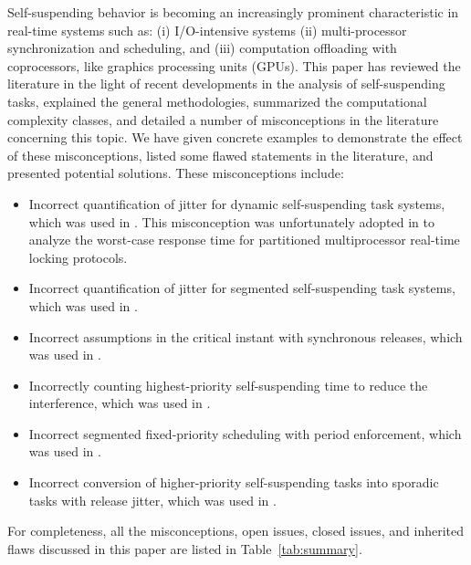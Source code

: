  Self-suspending behavior is becoming an increasingly prominent
characteristic in real-time systems such as: (i) I/O-intensive systems
(ii) multi-processor synchronization and scheduling, and (iii)
computation offloading with coprocessors, like graphics processing
units (GPUs).  This paper has reviewed the literature in the light of
recent developments in the analysis of self-suspending tasks,
explained the general methodologies, summarized the computational complexity classes, 
and detailed a number of 
misconceptions in the literature concerning this topic. We
have given concrete examples to demonstrate the effect of these
misconceptions, listed some flawed statements in the literature, and
presented potential solutions. These misconceptions include:
\begin{itemize}
\item Incorrect quantification of jitter for dynamic self-suspending
  task systems, which was used in
  \cite{ECRTS-AudsleyB04,RTAS-AudsleyB04,RTCSA-KimCPKH95,MingLiRTCSA1994}.  This
  misconception was unfortunately adopted in
  \cite{zeng-2011,bbb-2013,yang-2013,kim-2014,han-2014,carminati-2014,yang-2014,lakshmanan-2009} to analyze the worst-case response time for
  partitioned multiprocessor real-time locking protocols.
\item Incorrect quantification of jitter for segmented self-suspending
  task systems, which was used in  \cite{RTCSA-BletsasA05}.
\item Incorrect assumptions in the critical instant with
  synchronous releases, which was used in \cite{LR:rtas10}.
\item Incorrectly counting highest-priority self-suspending time to reduce the
  interference, which was used in  \cite{RTSS-KimANR13}. 
\item Incorrect segmented fixed-priority scheduling with period
  enforcement, which was used in
  \cite{RTSS-KimANR13,DBLP:journals/ieicet/DingTT09}.
\item Incorrect conversion of higher-priority self-suspending tasks into sporadic tasks with release jitter, which was used in \cite{ecrts15nelissen}.
\end{itemize}
For completeness, all the misconceptions, open issues, closed issues,
and inherited flaws discussed in this paper are listed in Table~\ref{tab:summary}.

